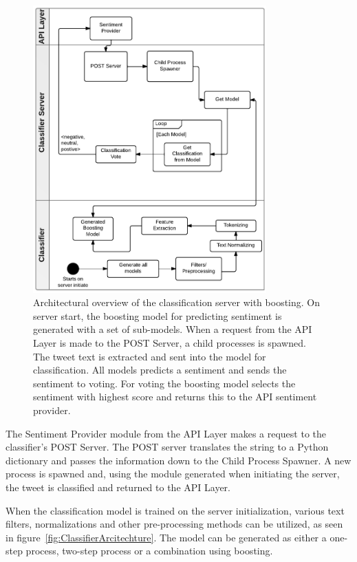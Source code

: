 \begin{figure}[!htb]
 \begin{center}
     \includegraphics[width=0.8\textwidth]{../img/ClassifierArcitechture30Boosting.pdf}
 \end{center}
 \caption[Architectural overview of the classification server with boosting.]{Architectural overview of the classification server with boosting. On server start, the boosting model for predicting sentiment is generated with a set of sub-models. When a request from the API Layer is made to the POST Server, a child processes is spawned. The tweet text is extracted and sent into the model for classification. All models predicts a sentiment and sends the sentiment to voting. For voting the boosting model selects the sentiment with highest score and returns this to the API sentiment provider.}
 \label{fig:ClassifierArcitechtureBoosting}
\end{figure}

The Sentiment Provider module from the API Layer makes a request to the classifier's POST Server. The POST server translates the string to a Python dictionary and passes the information down to the Child Process Spawner. A new process is spawned and, using the module generated when initiating the server, the tweet is classified and returned to the API Layer.

When the classification model is trained on the server initialization, various text filters, normalizations and other pre-processing methods can be utilized, as seen in figure~\ref{fig:ClassifierArcitechture}. The model can be generated as either a one-step process, two-step process or a combination using boosting. 

